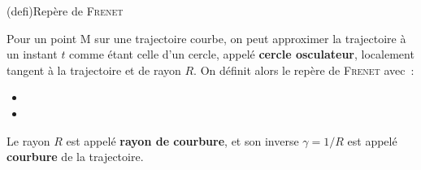 \documentclass[../../main/main.tex]{subfiles}
\begin{document}
\begin{tcb*}(defi){Repère de \textsc{Frenet}}
	\begin{isd}[righthand ratio=.25]
		Pour un point M sur une trajectoire courbe, on peut approximer la
		trajectoire à un instant $t$ comme étant celle d'un cercle, appelé
		\textbf{cercle osculateur}, localement tangent à la trajectoire et de
		rayon $R$. On définit alors le repère de \textsc{Frenet} avec~:
		\begin{itemize}
			\item {}
			\item
		\end{itemize}
		\tcblower
		\begin{center}
			\vspace{-15pt}
		\end{center}
	\end{isd}
	\smallbreak
	Le rayon $R$ est appelé \textbf{rayon de courbure}, et son inverse $\gamma =
		1/R$ est appelé \textbf{courbure} de la trajectoire.
\end{tcb*}
\end{document}
